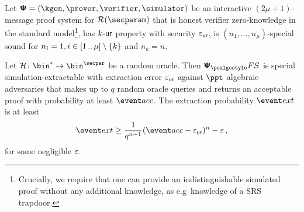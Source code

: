 \documentclass[runningheads,11pt]{llncs}
\begin{document}
\begin{theorem}
\label{thm:se}
Let $\ps = (\kgen, \prover, \verifier, \simulator)$ be an interactive
$(2 \mu + 1)$-message proof system for $\RELGEN(\secparam)$ that is honest
verifier zero-knowledge in the standard model\footnote{Crucially, we require
  that one can provide an indistinguishable simulated proof without any
  additional knowledge, as e.g~knowledge of a SRS trapdoor.}, has ${k\text{-}\mathsf{ur}}$
property with security $\varepsilon_{\mathsf{ur}}$, is $(n_1, \ldots, n_\mu)$-special
sound for $n_i = 1, i \in [1 \, .. \, \mu] \setminus \{k\}$ and $n_k = n$.

Let $\ro\colon \bin^{*} \to \bin^{\secpar}$ be a random oracle. 
Then $\psfs$ is special simulation-extractable with extraction error $\varepsilon_{\mathsf{ur}}$
against $\ppt$ algebraic adversaries that makes up to $q$ random oracle queries and
returns an acceptable proof with probability at least $\accProb$. 
The extraction probability $\extProb$ is at least
\[
	\extProb \geq \frac{1}{q^{n - 1}} (\accProb - \epsur)^{n} -\eps\,,
\]
for some negligible $\varepsilon$.	
\end{theorem}
\end{document}
